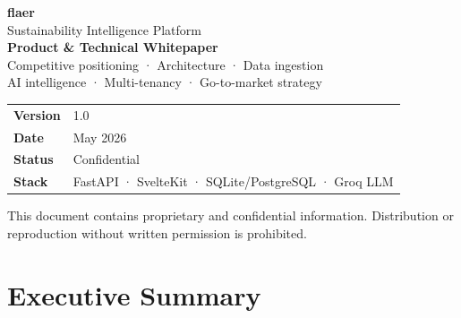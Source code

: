 \documentclass[11pt, a4paper]{article}
\begin{document}
\begin{titlepage}
\pagecolor{flaerdark}
\color{white}
\vspace*{3cm}


\hspace{0.4cm}
\begin{minipage}{0.88\textwidth}
  {\fontsize{48}{52}\selectfont\bfseries\color{flaergreen} flaer}\\[0.3cm]
  {\Large\color{white!80} Sustainability Intelligence Platform}\\[2cm]

  {\LARGE\bfseries Product \& Technical Whitepaper}\\[0.5cm]
  {\large\color{white!60}
    Competitive positioning · Architecture · Data ingestion \\
    AI intelligence · Multi-tenancy · Go-to-market strategy
  }\\[3cm]

  \begin{tabular}{ll}
    \textcolor{flaergreen}{\textbf{Version}} & 1.0 \\[3pt]
    \textcolor{flaergreen}{\textbf{Date}}    & May 2026 \\[3pt]
    \textcolor{flaergreen}{\textbf{Status}}  & Confidential \\[3pt]
    \textcolor{flaergreen}{\textbf{Stack}}   & FastAPI · SvelteKit · SQLite/PostgreSQL · Groq LLM \\
  \end{tabular}

  \vspace{2cm}
  \color{white!40}\small
  This document contains proprietary and confidential information. Distribution or reproduction without written permission is prohibited.
\end{minipage}
\end{titlepage}

\nopagecolor
\color{black}

\newpage
\tableofcontents
\newpage

\section{Executive Summary}
\end{document}
